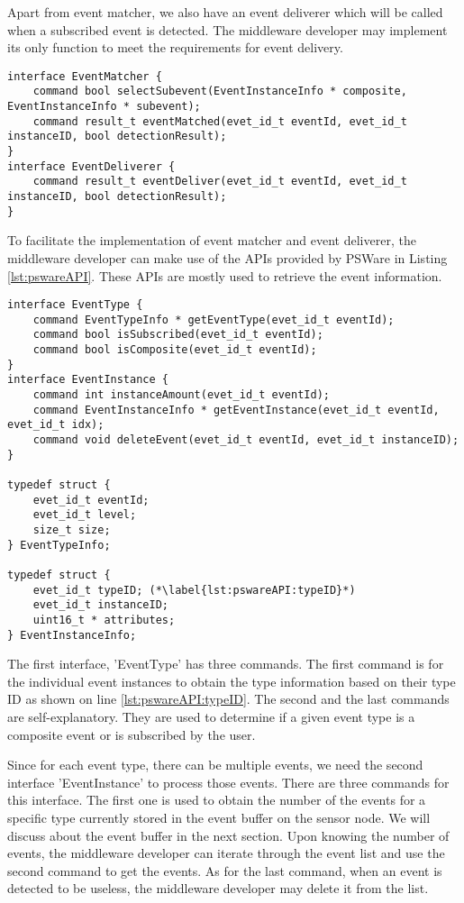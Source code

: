 Apart from event matcher, we also have an event deliverer which will be called when a subscribed event is detected. The middleware developer may implement its only function to meet the requirements for event delivery.
\begin{lstlisting}[caption=The event matcher interface, label=lst:pswareEventMatcher]
interface EventMatcher {
	command bool selectSubevent(EventInstanceInfo * composite, EventInstanceInfo * subevent);
	command result_t eventMatched(evet_id_t eventId, evet_id_t instanceID, bool detectionResult);
}
interface EventDeliverer {
	command result_t eventDeliver(evet_id_t eventId, evet_id_t instanceID, bool detectionResult);
}
\end{lstlisting}

To facilitate the implementation of event matcher and event deliverer, the middleware developer can make use of the APIs provided by PSWare in Listing \ref{lst:pswareAPI}. These APIs are mostly used to retrieve the event information.
\begin{lstlisting}[caption=PSWare API in NesC, label=lst:pswareAPI]
interface EventType {
	command EventTypeInfo * getEventType(evet_id_t eventId);
	command bool isSubscribed(evet_id_t eventId);
	command bool isComposite(evet_id_t eventId);
}
interface EventInstance {
	command int instanceAmount(evet_id_t eventId);
	command EventInstanceInfo * getEventInstance(evet_id_t eventId, evet_id_t idx);
	command void deleteEvent(evet_id_t eventId, evet_id_t instanceID);
}

typedef struct {
	evet_id_t eventId;
	evet_id_t level;
	size_t size;
} EventTypeInfo;

typedef struct {
	evet_id_t typeID; (*\label{lst:pswareAPI:typeID}*)
	evet_id_t instanceID;
	uint16_t * attributes;
} EventInstanceInfo;
\end{lstlisting}

The first interface, 'EventType' has three commands. The first command is for the individual event instances to obtain the type information based on their type ID as shown on line \ref{lst:pswareAPI:typeID}. The second and the last commands are self-explanatory. They are used to determine if a given event type is a composite event or is subscribed by the user.

Since for each event type, there can be multiple events, we need the second interface 'EventInstance' to process those events. There are three commands for this interface. The first one is used to obtain the number of the events for a specific type currently stored in the event buffer on the sensor node. We will discuss about the event buffer in the next section. Upon knowing the number of events, the middleware developer can iterate through the event list and use the second command to get the events. As for the last command, when an event is detected to be useless, the middleware developer may delete it from the list.

